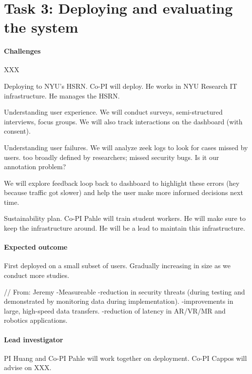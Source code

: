 \section{Task 3: Deploying and evaluating the system}

\paragraph{Challenges} XXX

Deploying to NYU's HSRN. Co-PI will deploy. He works in NYU Research IT infrastructure. He manages the HSRN.

Understanding user experience. We will conduct surveys, semi-structured interviews, focus groups. We will also track interactions on the dashboard (with consent).

Understanding user failures. We will analyze zeek logs to look for cases missed by users. too broadly defined by researchers; missed security bugs.  Is it our annotation problem?

We will explore feedback loop back to dashboard to highlight these errors (hey because traffic got slower) and help the user make more informed decisions next time.

Sustainability plan. Co-PI Pahle will train student workers. He will make sure to keep the infrastructure around. He will be a lead to maintain this infrastructure.

\paragraph{Expected outcome} First deployed on a small subset of users. Gradually increasing in size as we conduct more studies.

// From: Jeremy
	-Measureable
-reduction in security threats (during testing and demonstrated by monitoring
data during implementation).
	-improvements in large, high-speed data transfers.
	-reduction of latency in AR/VR/MR and robotics applications.


\paragraph{Lead investigator} PI Huang and Co-PI Pahle will work together on deployment. Co-PI Cappos will advise on XXX.
